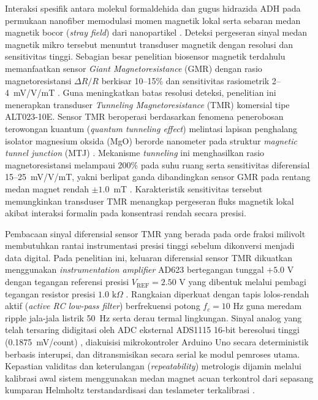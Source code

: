 Interaksi spesifik antara molekul formaldehida dan gugus hidrazida ADH pada permukaan nanofiber memodulasi momen magnetik lokal serta sebaran medan magnetik bocor (\textit{stray field}) dari nanopartikel . Deteksi pergeseran sinyal medan magnetik mikro tersebut menuntut transduser magnetik dengan resolusi dan sensitivitas tinggi. Sebagian besar penelitian biosensor magnetik terdahulu memanfaatkan sensor \textit{Giant Magnetoresistance} (GMR) dengan rasio magnetoresistansi $\Delta R/R$ berkisar 10--15\% dan sensitivitas rasiometrik 2--4~mV/V/mT \cite{gilang2026skripsi}. Guna meningkatkan batas resolusi deteksi, penelitian ini menerapkan transduser \textit{Tunneling Magnetoresistance} (TMR) komersial tipe ALT023-10E. Sensor TMR beroperasi berdasarkan fenomena penerobosan terowongan kuantum (\textit{quantum tunneling effect}) melintasi lapisan penghalang isolator magnesium oksida (MgO) berorde nanometer pada struktur \textit{magnetic tunnel junction} (MTJ) \cite{nanomedicine_mtj}. Mekanisme \textit{tunneling} ini menghasilkan rasio magnetoresistansi melampaui 200\% pada suhu ruang serta sensitivitas diferensial 15--25~mV/V/mT, yakni berlipat ganda dibandingkan sensor GMR pada rentang medan magnet rendah $\pm 1.0$~mT \cite{nve_alt023}. Karakteristik sensitivitas tersebut memungkinkan transduser TMR menangkap pergeseran fluks magnetik lokal akibat interaksi formalin pada konsentrasi rendah secara presisi.

Pembacaan sinyal diferensial sensor TMR yang berada pada orde fraksi milivolt membutuhkan rantai instrumentasi presisi tinggi sebelum dikonversi menjadi data digital. Pada penelitian ini, keluaran diferensial sensor TMR dikuatkan menggunakan \textit{instrumentation amplifier} AD623 bertegangan tunggal $+5.0\text{ V}$ dengan tegangan referensi presisi $V_{\text{REF}} = 2.50\text{ V}$ yang dibentuk melalui pembagi tegangan resistor presisi $1.0\text{ k}\Omega$ \cite{adi_ad623}. Rangkaian diperkuat dengan tapis lolos-rendah aktif (\textit{active RC low-pass filter}) berfrekuensi potong $f_c = 10\text{ Hz}$ guna meredam ripple jala-jala listrik 50~Hz serta derau termal lingkungan. Sinyal analog yang telah tersaring didigitasi oleh ADC eksternal ADS1115 16-bit beresolusi tinggi (0.1875~mV/count) \cite{ti_ads1115}, diakuisisi mikrokontroler Arduino Uno secara deterministik berbasis interupsi, dan ditransmisikan secara serial ke modul pemroses utama. Kepastian validitas dan keterulangan (\textit{repeatability}) metrologis dijamin melalui kalibrasi awal sistem menggunakan medan magnet acuan terkontrol dari sepasang kumparan Helmholtz terstandardisasi dan teslameter terkalibrasi \cite{zhu2023,ginisa2015,yudhistira2019}.

